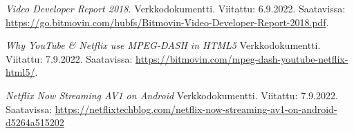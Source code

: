 \documentclass[finnish, 12pt, a4paper, elec, utf8, a-1b, online]{aaltothesis}
\begin{document}
\begin{thebibliography}{99}
    \textit{Video Developer Report 2018.}
    Verkkodokumentti.
    Viitattu: 6.9.2022.
    Saatavissa: \url{https://go.bitmovin.com/hubfs/Bitmovin-Video-Developer-Report-2018.pdf}.

    \textit{Why YouTube & Netflix use MPEG-DASH in HTML5}
    Verkkodokumentti.
    Viitattu: 7.9.2022.
    Saatavissa: \url{https://bitmovin.com/mpeg-dash-youtube-netflix-html5/}.

    \textit{Netflix Now Streaming AV1 on Android}
    Verkkodokumentti.
    Viitattu: 7.9.2022.
    Saatavissa: \url{https://netflixtechblog.com/netflix-now-streaming-av1-on-android-d5264a515202}

\end{thebibliography}
\end{document}
